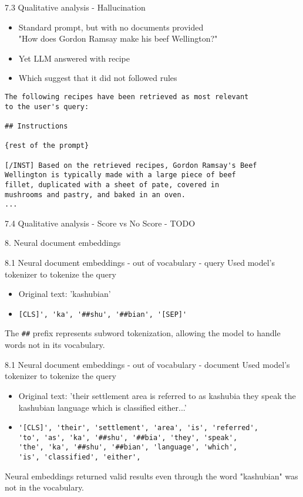 \documentclass{beamer}
\begin{document}
\begin{frame}[fragile]{7.3 Qualitative analysis - Hallucination}
  \begin{itemize}
    \item Standard prompt, but with no documents provided \\
    "How does Gordon Ramsay make his beef Wellington?"
    \item Yet LLM answered with recipe
    \item Which suggest that it did not followed rules
  \end{itemize}
  \begin{verbatim}
The following recipes have been retrieved as most relevant 
to the user's query:

## Instructions

{rest of the prompt}

[/INST] Based on the retrieved recipes, Gordon Ramsay's Beef
Wellington is typically made with a large piece of beef
fillet, duplicated with a sheet of pate, covered in
mushrooms and pastry, and baked in an oven.
...
  \end{verbatim}
\end{frame}

\begin{frame}{7.4 Qualitative analysis - Score vs No Score - TODO }
\end{frame}

\begin{frame}{8. Neural document embeddings}
\end{frame}

\begin{frame}[fragile]{8.1 Neural document embeddings - out of vocabulary - query}
  Used model's tokenizer to tokenize the query
  \begin{itemize}
    \item Original text: 'kashubian'
      \item \begin{verbatim}[CLS]', 'ka', '##shu', '##bian', '[SEP]'\end{verbatim}
    \end{itemize}
    The \verb|##| prefix represents subword tokenization, allowing the model to handle words not in its vocabulary.
\end{frame}
\begin{frame}[fragile]{8.1 Neural document embeddings - out of vocabulary - document}
  Used model's tokenizer to tokenize the query
    \begin{itemize}
      \item Original text: 'their settlement area is referred to as kashubia they speak the kashubian language which is classified either...'
      \item \begin{verbatim}
'[CLS]', 'their', 'settlement', 'area', 'is', 'referred',
'to', 'as', 'ka', '##shu', '##bia', 'they', 'speak',
'the', 'ka', '##shu', '##bian', 'language', 'which',
'is', 'classified', 'either',\end{verbatim}
    \end{itemize}
    Neural embeddings returned valid results even through the word "kashubian" was not in the vocabulary.
\end{frame}
\end{document}

